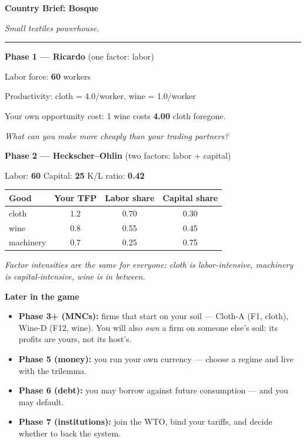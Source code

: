 \documentclass[11pt]{article}
\newcommand{\hr}{\par\vspace{2pt}\noindent\rule{\linewidth}{0.4pt}\par\vspace{2pt}}
\begin{document}
\newpage

{\Large\bfseries Country Brief: Bosque}\par
\textit{Small textiles powerhouse.}
\hr

{\bfseries Phase 1 --- Ricardo} \hfill (one factor: labor)\par
Labor force: \textbf{60} workers\par
Productivity: cloth = 4.0/worker, wine = 1.0/worker\par
Your own opportunity cost: 1 wine costs \textbf{4.00} cloth foregone.\par
\textit{What can you make more cheaply than your trading partners?}

\vspace{6pt}
{\bfseries Phase 2 --- Heckscher--Ohlin} \hfill (two factors: labor + capital)\par
Labor: \textbf{60} \quad Capital: \textbf{25} \quad K/L ratio: \textbf{0.42}\par
\vspace{2pt}
\begin{tabular}{lccc}
\toprule
Good & Your TFP & Labor share & Capital share \\
\midrule
    cloth & 1.2 & 0.70 & 0.30 \\
    wine & 0.8 & 0.55 & 0.45 \\
    machinery & 0.7 & 0.25 & 0.75 \\
\bottomrule
\end{tabular}\par
\vspace{2pt}
\textit{Factor intensities are the same for everyone: cloth is labor-intensive,
machinery is capital-intensive, wine is in between.}

\vspace{6pt}
{\bfseries Later in the game}\par
\begin{itemize}[nosep,leftmargin=1.4em]
  \item \textbf{Phase 3+ (MNCs):} firms that start on your soil --- Cloth-A (F1, cloth), Wine-D (F12, wine).
    You will also \emph{own} a firm on someone else's soil: its profits are
    yours, not its host's.
  \item \textbf{Phase 5 (money):} you run your own currency --- choose a regime and live with the trilemma.
  \item \textbf{Phase 6 (debt):} you may borrow against future consumption --- and you may default.
  \item \textbf{Phase 7 (institutions):} join the WTO, bind your tariffs, and decide whether to back the system.
\end{itemize}
\end{document}
